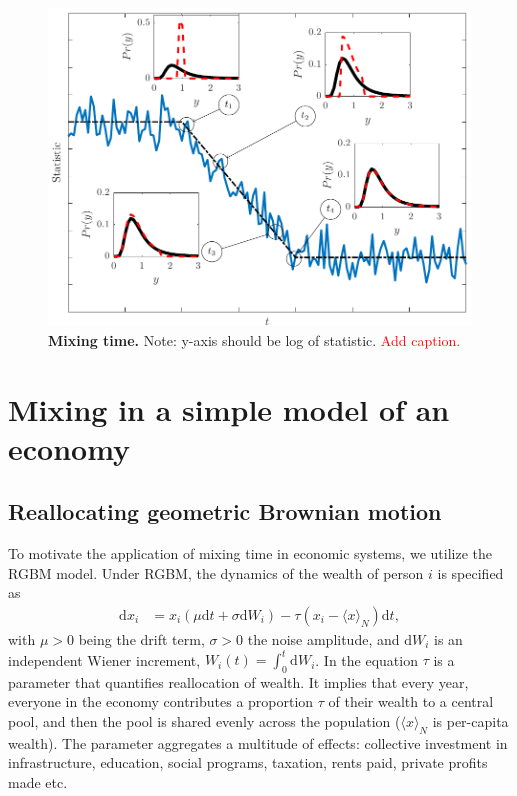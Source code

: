 \documentclass[11pt]{article}
\numberwithin{equation}{section}
\begin{document}
\begin{figure}[t!]
\includegraphics[width=\linewidth]{figs/fig_mixing_time.pdf}
\caption{\textbf{Mixing time.} Note: y-axis should be log of statistic. \textcolor{red}{Add caption.} \label{fig:mixing-time}}
\end{figure}


\section{Mixing in a simple model of an economy}\label{sec:rgbm}

\subsection{Reallocating geometric Brownian motion}
To motivate the application of mixing time in economic systems, we utilize the RGBM model. Under RGBM, the dynamics of the wealth of person $i$ is specified as
\begin{align}
    \mathrm{d} x_i &= x_i \left( \mu \mathrm{d}t + \sigma \mathrm{d}W_i \right) - \tau \left( x_i - \langle x \rangle_N \right) \mathrm{d}t,
\label{eq:rgbm}
\end{align}
with $\mu > 0$ being the drift term, $\sigma > 0$ the noise amplitude, and $\mathrm{d}W_i$ is an independent Wiener increment, $W_i(t) =\int_0^t \mathrm{d}W_i$. In the equation $\tau$ is a parameter that quantifies reallocation of wealth. It implies that every year, everyone in the economy contributes a proportion $\tau$ of their wealth to a central pool, and then the pool is shared evenly across the population ($\langle x \rangle_N$ is per-capita wealth). The parameter aggregates a multitude of effects: collective investment in infrastructure, education, social programs, taxation, rents paid, private profits made etc. 
\end{document}
